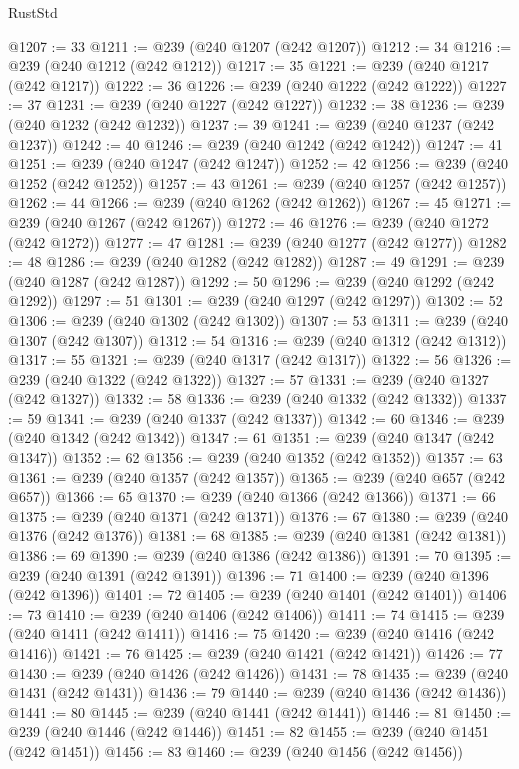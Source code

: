 \begin{lexlean}{RustStd}
\begin{coremodule}
@1207 := 33
@1211 := @239 (@240 @1207 (@242 @1207))
@1212 := 34
@1216 := @239 (@240 @1212 (@242 @1212))
@1217 := 35
@1221 := @239 (@240 @1217 (@242 @1217))
@1222 := 36
@1226 := @239 (@240 @1222 (@242 @1222))
@1227 := 37
@1231 := @239 (@240 @1227 (@242 @1227))
@1232 := 38
@1236 := @239 (@240 @1232 (@242 @1232))
@1237 := 39
@1241 := @239 (@240 @1237 (@242 @1237))
@1242 := 40
@1246 := @239 (@240 @1242 (@242 @1242))
@1247 := 41
@1251 := @239 (@240 @1247 (@242 @1247))
@1252 := 42
@1256 := @239 (@240 @1252 (@242 @1252))
@1257 := 43
@1261 := @239 (@240 @1257 (@242 @1257))
@1262 := 44
@1266 := @239 (@240 @1262 (@242 @1262))
@1267 := 45
@1271 := @239 (@240 @1267 (@242 @1267))
@1272 := 46
@1276 := @239 (@240 @1272 (@242 @1272))
@1277 := 47
@1281 := @239 (@240 @1277 (@242 @1277))
@1282 := 48
@1286 := @239 (@240 @1282 (@242 @1282))
@1287 := 49
@1291 := @239 (@240 @1287 (@242 @1287))
@1292 := 50
@1296 := @239 (@240 @1292 (@242 @1292))
@1297 := 51
@1301 := @239 (@240 @1297 (@242 @1297))
@1302 := 52
@1306 := @239 (@240 @1302 (@242 @1302))
@1307 := 53
@1311 := @239 (@240 @1307 (@242 @1307))
@1312 := 54
@1316 := @239 (@240 @1312 (@242 @1312))
@1317 := 55
@1321 := @239 (@240 @1317 (@242 @1317))
@1322 := 56
@1326 := @239 (@240 @1322 (@242 @1322))
@1327 := 57
@1331 := @239 (@240 @1327 (@242 @1327))
@1332 := 58
@1336 := @239 (@240 @1332 (@242 @1332))
@1337 := 59
@1341 := @239 (@240 @1337 (@242 @1337))
@1342 := 60
@1346 := @239 (@240 @1342 (@242 @1342))
@1347 := 61
@1351 := @239 (@240 @1347 (@242 @1347))
@1352 := 62
@1356 := @239 (@240 @1352 (@242 @1352))
@1357 := 63
@1361 := @239 (@240 @1357 (@242 @1357))
@1365 := @239 (@240 @657 (@242 @657))
@1366 := 65
@1370 := @239 (@240 @1366 (@242 @1366))
@1371 := 66
@1375 := @239 (@240 @1371 (@242 @1371))
@1376 := 67
@1380 := @239 (@240 @1376 (@242 @1376))
@1381 := 68
@1385 := @239 (@240 @1381 (@242 @1381))
@1386 := 69
@1390 := @239 (@240 @1386 (@242 @1386))
@1391 := 70
@1395 := @239 (@240 @1391 (@242 @1391))
@1396 := 71
@1400 := @239 (@240 @1396 (@242 @1396))
@1401 := 72
@1405 := @239 (@240 @1401 (@242 @1401))
@1406 := 73
@1410 := @239 (@240 @1406 (@242 @1406))
@1411 := 74
@1415 := @239 (@240 @1411 (@242 @1411))
@1416 := 75
@1420 := @239 (@240 @1416 (@242 @1416))
@1421 := 76
@1425 := @239 (@240 @1421 (@242 @1421))
@1426 := 77
@1430 := @239 (@240 @1426 (@242 @1426))
@1431 := 78
@1435 := @239 (@240 @1431 (@242 @1431))
@1436 := 79
@1440 := @239 (@240 @1436 (@242 @1436))
@1441 := 80
@1445 := @239 (@240 @1441 (@242 @1441))
@1446 := 81
@1450 := @239 (@240 @1446 (@242 @1446))
@1451 := 82
@1455 := @239 (@240 @1451 (@242 @1451))
@1456 := 83
@1460 := @239 (@240 @1456 (@242 @1456))

\end{coremodule}
\end{lexlean}
